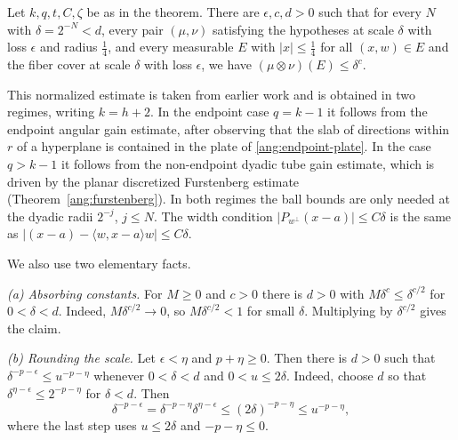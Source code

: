 \begin{lemma}\label{lpg:unit}
Let $k,q,t,C,\zeta$ be as in the theorem. There are $\epsilon,c,d>0$ such that for every $N$ with $\delta=2^{-N}<d$, every pair $(\mu,\nu)$ satisfying the hypotheses at scale $\delta$ with loss $\epsilon$ and radius $\tfrac14$, and every measurable $E$ with $|x|\le\tfrac14$ for all $(x,w)\in E$ and the fiber cover at scale $\delta$ with loss $\epsilon$, we have $(\mu\otimes\nu)(E)\le\delta^c$.
\end{lemma}

This normalized estimate is taken from earlier work and is obtained in two regimes, writing $k=h+2$. In the endpoint case $q=k-1$ it follows from the endpoint angular gain estimate, after observing that the slab of directions within $r$ of a hyperplane is contained in the plate of \eqref{ang:endpoint-plate}. In the case $q>k-1$ it follows from the non-endpoint dyadic tube gain estimate, which is driven by the planar discretized Furstenberg estimate (Theorem~\ref{ang:furstenberg}). In both regimes the ball bounds are only needed at the dyadic radii $2^{-j}$, $j\le N$. The width condition $|P_{w^\perp}(x-a)|\le C\delta$ is the same as $|(x-a)-\langle w,x-a\rangle w|\le C\delta$.

We also use two elementary facts.

\emph{(a) Absorbing constants.} For $M\ge0$ and $c>0$ there is $d>0$ with $M\delta^c\le\delta^{c/2}$ for $0<\delta<d$. Indeed, $M\delta^{c/2}\to0$, so $M\delta^{c/2}<1$ for small $\delta$. Multiplying by $\delta^{c/2}$ gives the claim.

\emph{(b) Rounding the scale.} Let $\epsilon<\eta$ and $p+\eta\ge0$. Then there is $d>0$ such that $\delta^{-p-\epsilon}\le u^{-p-\eta}$ whenever $0<\delta<d$ and $0<u\le2\delta$. Indeed, choose $d$ so that $\delta^{\eta-\epsilon}\le2^{-p-\eta}$ for $\delta<d$. Then
\[
\delta^{-p-\epsilon}=\delta^{-p-\eta}\delta^{\eta-\epsilon}\le(2\delta)^{-p-\eta}\le u^{-p-\eta},
\]
where the last step uses $u\le2\delta$ and $-p-\eta\le0$.

